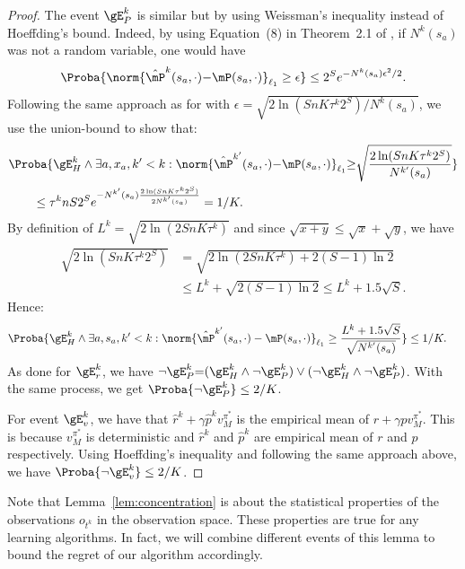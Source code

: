 \begin{subappendices}
\begin{proof}
    The event $\gE^{k}_P$ is similar but by using Weissman's inequality \cite{weissman2003inequalities} instead of Hoeffding's bound. Indeed, by using Equation~(8) in Theorem~2.1 of \cite{weissman2003inequalities}, if $N^{k}(s_a)$ was not a random variable, one would have 
    \begin{align*}
        \Proba{\norm{\hat{\mP}^{k}(s_a,\cdot){-}\mP(s_a,\cdot)}_{\ell_1}\ge \epsilon} \le 2^S e^{- N^{k}(s_a) \epsilon^2/2}.
    \end{align*}
    Following the same approach as for  with $\epsilon=\sqrt{2\ln(SnK\tau^k2^S)/N^{k}(s_a)}$, we use the union-bound to show that:
    \begin{align*}
        &\Proba{\gE^{k}_H\land\exists a, x_a, k'<k: \norm{\hat{\mP}^{k'}(s_a,\cdot){-}\mP(s_a,\cdot)}_{\ell_1} {\ge} \sqrt{\frac{2\ln(SnK\tau^k 2^S)}{N^{k'}(s_a)}}} \\
        &\qquad \le \tau^k n S 2^Se^{ -N^{k'}(s_a)\frac{2\ln(SnK\tau^k2^S)}{2N^{k'}(s_a)}} = 1/K.
    \end{align*}
    By definition of $L^{k}=\sqrt{2\ln(2SnK\tau^k)}$ and since $\sqrt{x+y}\le\sqrt{x}+\sqrt{y}$, we have
    \begin{align*}
      \sqrt{2\ln(SnK\tau^k2^S)}
      &=\sqrt{2\ln(2SnK\tau^k) {+} 2(S-1)\ln 2}\\
      & \le L^{k} +\sqrt{2(S-1)\ln2} \le L^{k} + 1.5\sqrt{S}.
    \end{align*}
    Hence: 
    \begin{align*}
        &\Proba{\gE^{k}_H\land\exists a, s_a, k'< k: \norm{\hat{\mP}^{k'}(s_a,\cdot)-\mP(s_a,\cdot)}_{\ell_1} \ge \frac{L^{k}+1.5\sqrt{S}}{\sqrt{N^{k'}(s_a)}}} \le 1/K.
    \end{align*}
    As done for $\gE_r^{k}$, we have $\lnot \gE^{k}_P {=}(\gE^{k}_H \land \lnot \gE^{k}_P) \lor (\lnot \gE^{k}_H \land \lnot \gE^{k}_P)$. With the same process, we get $\Proba{\lnot \gE^{k}_P}\le 2/K$.
        
    For event $\gE^{k}_v$, we have that $\hat{r}^{k}+\gamma\hat{p}^{k}v_M^{\pi^*}$ is the empirical mean of $r+\gamma p v_M^{\pi^*}$.
    This is because $v_M^{\pi^*}$ is deterministic and $\hat{r}^{k}$ and $\hat{p}^{k}$ are empirical mean of $r$ and $p$ respectively.
    Using Hoeffding's inequality and following the same approach above, we have $\Proba{\neg \gE^{k}_v}\le 2/K$.
\end{proof}
Note that Lemma~\ref{lem:concentration} is about the statistical properties of the observations $o_{t^k}$ in the observation space.
These properties are true for any learning algorithms.
In fact, we will combine different events of this lemma to bound the regret of our algorithm accordingly.


\end{subappendices}
